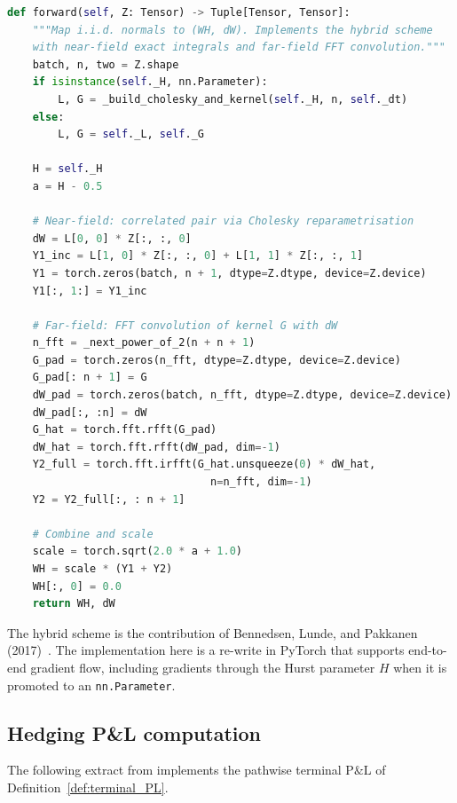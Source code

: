\documentclass[12pt,a4paper]{article}
\theoremstyle{definition}
\theoremstyle{plain}
\theoremstyle{remark}
\theoremstyle{plain}
\begin{document}
\begin{lstlisting}[language=Python, caption={HybridVolterraDriver.forward}, label={lst:volterra_code}]
def forward(self, Z: Tensor) -> Tuple[Tensor, Tensor]:
    """Map i.i.d. normals to (WH, dW). Implements the hybrid scheme
    with near-field exact integrals and far-field FFT convolution."""
    batch, n, two = Z.shape
    if isinstance(self._H, nn.Parameter):
        L, G = _build_cholesky_and_kernel(self._H, n, self._dt)
    else:
        L, G = self._L, self._G

    H = self._H
    a = H - 0.5

    # Near-field: correlated pair via Cholesky reparametrisation
    dW = L[0, 0] * Z[:, :, 0]
    Y1_inc = L[1, 0] * Z[:, :, 0] + L[1, 1] * Z[:, :, 1]
    Y1 = torch.zeros(batch, n + 1, dtype=Z.dtype, device=Z.device)
    Y1[:, 1:] = Y1_inc

    # Far-field: FFT convolution of kernel G with dW
    n_fft = _next_power_of_2(n + n + 1)
    G_pad = torch.zeros(n_fft, dtype=Z.dtype, device=Z.device)
    G_pad[: n + 1] = G
    dW_pad = torch.zeros(batch, n_fft, dtype=Z.dtype, device=Z.device)
    dW_pad[:, :n] = dW
    G_hat = torch.fft.rfft(G_pad)
    dW_hat = torch.fft.rfft(dW_pad, dim=-1)
    Y2_full = torch.fft.irfft(G_hat.unsqueeze(0) * dW_hat,
                                n=n_fft, dim=-1)
    Y2 = Y2_full[:, : n + 1]

    # Combine and scale
    scale = torch.sqrt(2.0 * a + 1.0)
    WH = scale * (Y1 + Y2)
    WH[:, 0] = 0.0
    return WH, dW
\end{lstlisting}

The hybrid scheme is the contribution of
Bennedsen, Lunde, and Pakkanen
(2017)~\cite{BennedsenLundePakkanen2017}. The implementation here is a
re-write in PyTorch that supports end-to-end gradient flow, including
gradients through the Hurst parameter $H$ when it is promoted to an
\texttt{nn.Parameter}.

\subsection{Hedging P\&L computation}
\label{lst:hedging_pnl}

The following extract from 
implements the pathwise terminal $\mathrm{P\&L}$ of
Definition~\ref{def:terminal_PL}.
\end{document}
